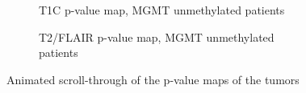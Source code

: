 \begin{subappendices}
\begin{figure}[H]
            \begin{subfigure}[t]{0.4\textwidth}
                \centering
                \caption{\acrshort{T1C} p-value map, \acrshort{MGMT} unmethylated patients}\label{fig:HGG_loc_T1_p_value_map_unmethylated}
            \end{subfigure}
            \hfill
            \begin{subfigure}[t]{0.4\textwidth}
                \centering
                \caption{\acrshort{T2}/\acrshort{FLAIR} p-value map, \acrshort{MGMT} unmethylated patients}\label{fig:HGG_loc_T2_p_value_map_unmethylated}
            \end{subfigure}
            \caption{Animated scroll-through of the p-value maps of the \glspl{tumor}}\label{fig:HGG_loc_p_value_map_full}
        \end{figure}
    \end{subappendices}
\fi
